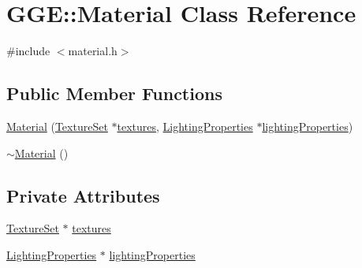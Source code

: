 \hypertarget{class_g_g_e_1_1_material}{\section{G\+G\+E\+:\+:Material Class Reference}
\label{class_g_g_e_1_1_material}
}


{\ttfamily \#include $<$material.\+h$>$}

\subsection*{Public Member Functions}
\begin{DoxyCompactItemize}
\item 
\hyperlink{class_g_g_e_1_1_material_a76594489c04a3728fe49de09f50eb448}{Material} (\hyperlink{struct_g_g_e_1_1_texture_set}{Texture\+Set} $\ast$\hyperlink{class_g_g_e_1_1_material_a2f8ced3599abf933e28c9f70a879e4e0}{textures}, \hyperlink{struct_g_g_e_1_1_lighting_properties}{Lighting\+Properties} $\ast$\hyperlink{class_g_g_e_1_1_material_acdd2f61d60cb734b5ee28397ee77c3c3}{lighting\+Properties})
\item 
\hyperlink{class_g_g_e_1_1_material_a1e5e0663a21100e3da6d76c9c867bb97}{$\sim$\+Material} ()
\end{DoxyCompactItemize}
\subsection*{Private Attributes}
\begin{DoxyCompactItemize}
\item 
\hyperlink{struct_g_g_e_1_1_texture_set}{Texture\+Set} $\ast$ \hyperlink{class_g_g_e_1_1_material_a2f8ced3599abf933e28c9f70a879e4e0}{textures}
\item 
\hyperlink{struct_g_g_e_1_1_lighting_properties}{Lighting\+Properties} $\ast$ \hyperlink{class_g_g_e_1_1_material_acdd2f61d60cb734b5ee28397ee77c3c3}{lighting\+Properties}
\end{DoxyCompactItemize}



